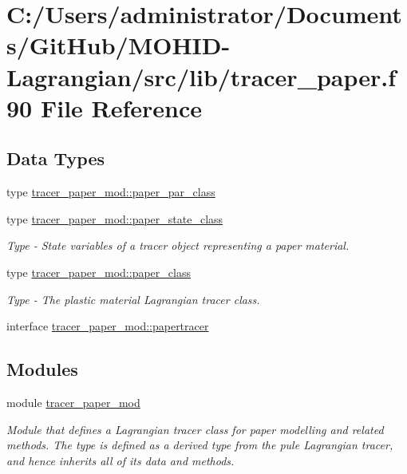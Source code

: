 \hypertarget{tracer__paper_8f90}{}\section{C\+:/\+Users/administrator/\+Documents/\+Git\+Hub/\+M\+O\+H\+I\+D-\/\+Lagrangian/src/lib/tracer\+\_\+paper.f90 File Reference}
\label{tracer__paper_8f90}
\subsection*{Data Types}
\begin{DoxyCompactItemize}
\item 
type \mbox{\hyperlink{structtracer__paper__mod_1_1paper__par__class}{tracer\+\_\+paper\+\_\+mod\+::paper\+\_\+par\+\_\+class}}
\item 
type \mbox{\hyperlink{structtracer__paper__mod_1_1paper__state__class}{tracer\+\_\+paper\+\_\+mod\+::paper\+\_\+state\+\_\+class}}
\begin{DoxyCompactList}\small\item\em Type -\/ State variables of a tracer object representing a paper material. \end{DoxyCompactList}\item 
type \mbox{\hyperlink{structtracer__paper__mod_1_1paper__class}{tracer\+\_\+paper\+\_\+mod\+::paper\+\_\+class}}
\begin{DoxyCompactList}\small\item\em Type -\/ The plastic material Lagrangian tracer class. \end{DoxyCompactList}\item 
interface \mbox{\hyperlink{interfacetracer__paper__mod_1_1papertracer}{tracer\+\_\+paper\+\_\+mod\+::papertracer}}
\end{DoxyCompactItemize}
\subsection*{Modules}
\begin{DoxyCompactItemize}
\item 
module \mbox{\hyperlink{namespacetracer__paper__mod}{tracer\+\_\+paper\+\_\+mod}}
\begin{DoxyCompactList}\small\item\em Module that defines a Lagrangian tracer class for paper modelling and related methods. The type is defined as a derived type from the pule Lagrangian tracer, and hence inherits all of it\textquotesingle{}s data and methods. \end{DoxyCompactList}\end{DoxyCompactItemize}
